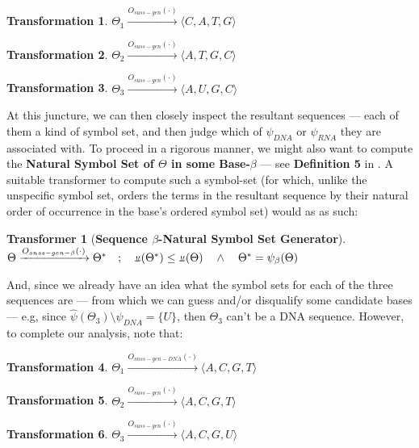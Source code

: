 \documentclass[a4paper, 18pt]{book} %
\newtheorem{trans}{Transformation}
\newtheorem{transf}{Transformer}
\newcommand{\invpi}{\rotatebox[origin=c]{180}{$\pi$}}
\begin{document}
\begin{trans}
$\Theta_1 \xrightarrow{O_{suss-gen}(\cdot)} \langle C, A, T, G \rangle$
\end{trans}

\begin{trans}
$\Theta_2 \xrightarrow{O_{suss-gen}(\cdot)} \langle A, T, G, C \rangle$
\end{trans}

\begin{trans}
$\Theta_3 \xrightarrow{O_{suss-gen}(\cdot)} \langle A, U, G, C \rangle$
\end{trans}

At this juncture, we can then closely inspect the resultant sequences --- each of them a kind of symbol set, and then judge which of $\psi_{DNA}$ or $\psi_{RNA}$ they are associated with. To proceed in a rigorous manner, we might also want to compute the \textbf{Natural Symbol Set of $\Theta$ in some Base-$\beta$} --- see \textbf{Definition 5} in \cite{ossipaper}. A suitable transformer to compute such a symbol-set (for which, unlike the unspecific symbol set, orders the terms in the resultant sequence by their natural order of occurrence in the base's ordered symbol set) would as as such:\\


\begin{transf}[\textbf{Sequence $\beta$-Natural Symbol Set Generator}]
\label{TRANSNSGEN}$ $\\
$\Theta \xrightarrow{O_{snss-gen-\beta}(\cdot)} \Theta^* \quad;\quad \invpi(\Theta^*) \leq \invpi(\Theta) \quad \land \quad \Theta^* = \psi_\beta(\Theta)$
\end{transf}

And, since we already have an idea what the symbol sets for each of the three sequences are --- from which we can guess and/or disqualify some candidate bases --- e.g, since $\hat{\psi}(\Theta_3) \setminus \psi_{DNA} = \{U\}$, then $\Theta_3$ can't be a DNA sequence. However, to complete our analysis, note that:


\begin{trans}
$\Theta_1 \xrightarrow{O_{snss-gen-DNA}(\cdot)} \langle A, C, G, T \rangle$
\end{trans}

\begin{trans}
$\Theta_2 \xrightarrow{O_{suss-gen}(\cdot)} \langle A, C, G, T \rangle$
\end{trans}

\begin{trans}
$\Theta_3 \xrightarrow{O_{suss-gen}(\cdot)} \langle A, C, G, U \rangle$
\end{trans}
\end{document}

